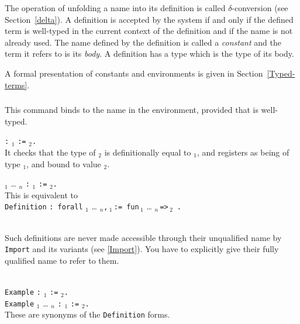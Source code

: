 The operation of unfolding a name into its definition is called
$\delta$-conversion (see
Section~\ref{delta}).  A definition is accepted by the system if and
only if the defined term is well-typed in the current context of the
definition and if the name is not already used. The name defined by
the definition is called a {\em constant} and the term
it refers to is its {\em body}.  A definition has a type which is the
type of its body.

A formal presentation of constants and environments is given in
Section~\ref{Typed-terms}.

\subsubsection{}

This command binds {\term} to the name {\ident} in the
environment, provided that {\term} is well-typed.

\begin{ErrMsgs}
\item {}
\end{ErrMsgs}

\begin{Variants}
\item { {\ident} {\tt :} {\term$_1$} {\tt :=} {\term$_2$}{\tt .}}\\
  It checks that the type of {\term$_2$} is definitionally equal to
  {\term$_1$}, and registers {\ident} as being of type {\term$_1$},
  and bound to value {\term$_2$}.
\item { {\ident} {\binder$_1$} {\ldots} {\binder$_n$}}
       {\tt :} \term$_1$ {\tt :=} {\term$_2$}{\tt .}\\
  This is equivalent to \\
   {\tt Definition} {\ident} {\tt : forall}%
       {\binder$_1$} {\ldots} {\binder$_n$}{\tt ,}\,\term$_1$\,{\tt :=}\,%
       {\tt fun}\,{\binder$_1$} {\ldots} {\binder$_n$}\,{\tt =>}\,{\term$_2$}\,%
       {\tt .}

\item {}\\
  Such definitions are never made accessible through their unqualified name by
  {\tt Import} and its variants (see \ref{Import}). You have to explicitly
  give their fully qualified name to refer to them.
\item {}\\
{\tt Example} {\ident} {\tt :} {\term$_1$} {\tt :=} {\term$_2$}{\tt .}\\
{\tt Example} {\ident} {\binder$_1$} {\ldots} {\binder$_n$}
       {\tt :} {\term$_1$} {\tt :=} {\term$_2$}{\tt .}\\
These are synonyms of the {\tt Definition} forms.
\end{Variants}

